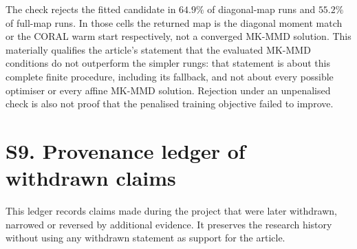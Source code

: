 \documentclass[a4paper,fleqn]{cas-dc}
\begin{document}
The check rejects the fitted candidate in $64.9\%$ of diagonal-map runs and
$55.2\%$ of full-map runs. In those cells the returned map is the diagonal
moment match or the CORAL warm start respectively, not a converged MK-MMD
solution. This materially qualifies the article's statement that the evaluated
MK-MMD conditions do not outperform the simpler rungs: that statement is about
this complete finite procedure, including its fallback, and not about every
possible optimiser or every affine MK-MMD solution. Rejection under an
unpenalised check is also not proof that the penalised training objective failed
to improve.

\section*{S9. Provenance ledger of withdrawn claims}
\label{sec:s-provenance}

This ledger records claims made during the project that were later withdrawn,
narrowed or reversed by additional evidence. It preserves the research history
without using any withdrawn statement as support for the article.
\end{document}
